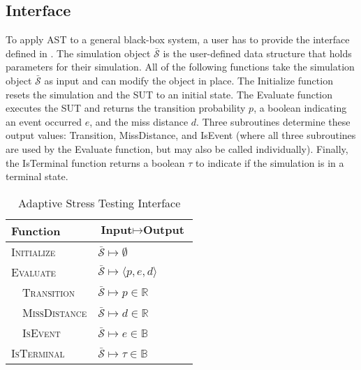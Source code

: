\subsection{Interface}\label{sec:ast_implementation_interface}
To apply AST to a general black-box system, a user has to provide the interface defined in .
% 
The simulation object $\bar{\mathcal{S}}$ is the user-defined data structure that holds parameters for their simulation.
All of the following functions take the simulation object $\bar{\mathcal{S}}$ as input and can modify the object in place.
The {\sc Initialize} function resets the simulation and the SUT to an initial state.
The {\sc Evaluate} function executes the SUT and returns the transition probability $p$, a boolean indicating an event occurred $e$, and the miss distance $d$.
Three subroutines determine these output values: {\sc Transition}, {\sc MissDistance}, and {\sc IsEvent} (where all three subroutines are used by the {\sc Evaluate} function, but may also be called individually).
Finally, the {\sc IsTerminal} function returns a boolean $\tau$ to indicate if the simulation is in a terminal state.

\begin{table}[!h]
  \centering
  \caption{\label{tab:interface} Adaptive Stress Testing Interface}
  \begin{threeparttable}
  \begin{tabular}{@{}p{6cm}l@{}} %
    \toprule
    \textbf{Function} & \textbf{$\bm{\text{Input}\mapsto\text{Output}}$} \\
    \midrule
    \textsc{Initialize} & $\bar{\mathcal{S}} \mapsto \emptyset$ \\
    \textsc{Evaluate} & $\bar{\mathcal{S}} \mapsto \langle p, e, d \rangle$ \\
    $\quad$\textsc{Transition} & $\bar{\mathcal{S}} \mapsto p \in \mathbb{R}$ \\
    $\quad$\textsc{MissDistance} & $\bar{\mathcal{S}} \mapsto d \in \mathbb{R}$ \\
    $\quad$\textsc{IsEvent} & $\bar{\mathcal{S}} \mapsto e \in \mathbb{B}$ \\
    \textsc{IsTerminal} & $\bar{\mathcal{S}} \mapsto \tau \in \mathbb{B}$ \\
    \bottomrule
  \end{tabular}
  \end{threeparttable}
\end{table}



